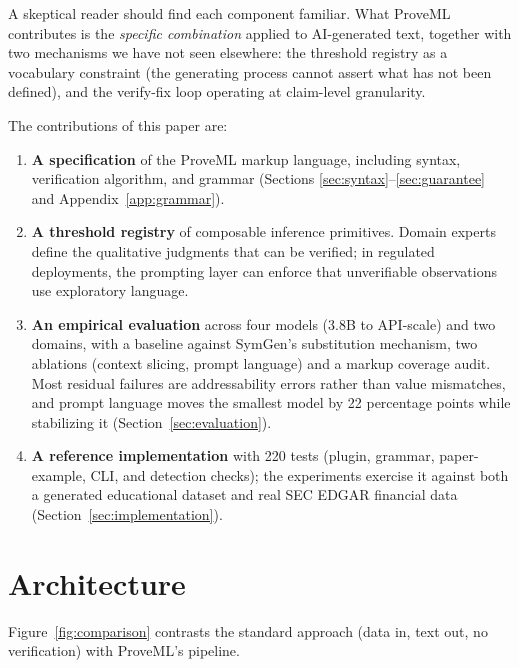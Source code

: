 \documentclass[11pt,a4paper]{article}
\begin{document}
\noindent A skeptical reader should find each component familiar. What ProveML contributes is the \textit{specific combination} applied to AI-generated text, together with two mechanisms we have not seen elsewhere: the threshold registry as a vocabulary constraint (the generating process cannot assert what has not been defined), and the verify-fix loop operating at claim-level granularity.

The contributions of this paper are:

\begin{enumerate}
    \item \textbf{A specification} of the ProveML markup language, including syntax, verification algorithm, and grammar (Sections \ref{sec:syntax}--\ref{sec:guarantee} and Appendix~\ref{app:grammar}).
    \item \textbf{A threshold registry} of composable inference primitives. Domain experts define the qualitative judgments that can be verified; in regulated deployments, the prompting layer can enforce that unverifiable observations use exploratory language.
    \item \textbf{An empirical evaluation} across four models (3.8B to API-scale) and two domains, with a baseline against SymGen's substitution mechanism, two ablations (context slicing, prompt language) and a markup coverage audit. Most residual failures are addressability errors rather than value mismatches, and prompt language moves the smallest model by 22 percentage points while stabilizing it (Section~\ref{sec:evaluation}).
    \item \textbf{A reference implementation} with 220 tests (plugin, grammar, paper-example, CLI, and detection checks); the experiments exercise it against both a generated educational dataset and real SEC EDGAR financial data (Section~\ref{sec:implementation}).
\end{enumerate}

\section{Architecture}

Figure~\ref{fig:comparison} contrasts the standard approach (data in, text out, no verification) with ProveML's pipeline.
\end{document}

